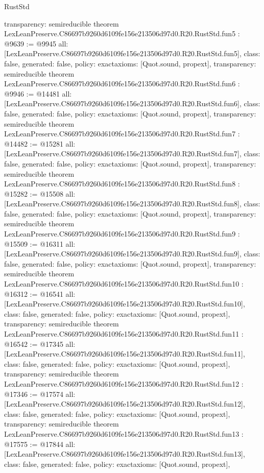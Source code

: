 \begin{lexlean}{RustStd}
\begin{coremodule}
{  transparency: semireducible
}
theorem LexLeanPreserve.C86697b9260d6109fe156e213506d97d0.R20.RustStd.fun5 : @9639 := @9945 {
  all: [LexLeanPreserve.C86697b9260d6109fe156e213506d97d0.R20.RustStd.fun5],
  class: false,
  generated: false,
  policy: exact{axioms: [Quot.sound, propext]},
  transparency: semireducible
}
theorem LexLeanPreserve.C86697b9260d6109fe156e213506d97d0.R20.RustStd.fun6 : @9946 := @14481 {
  all: [LexLeanPreserve.C86697b9260d6109fe156e213506d97d0.R20.RustStd.fun6],
  class: false,
  generated: false,
  policy: exact{axioms: [Quot.sound, propext]},
  transparency: semireducible
}
theorem LexLeanPreserve.C86697b9260d6109fe156e213506d97d0.R20.RustStd.fun7 : @14482 := @15281 {
  all: [LexLeanPreserve.C86697b9260d6109fe156e213506d97d0.R20.RustStd.fun7],
  class: false,
  generated: false,
  policy: exact{axioms: [Quot.sound, propext]},
  transparency: semireducible
}
theorem LexLeanPreserve.C86697b9260d6109fe156e213506d97d0.R20.RustStd.fun8 : @15282 := @15508 {
  all: [LexLeanPreserve.C86697b9260d6109fe156e213506d97d0.R20.RustStd.fun8],
  class: false,
  generated: false,
  policy: exact{axioms: [Quot.sound, propext]},
  transparency: semireducible
}
theorem LexLeanPreserve.C86697b9260d6109fe156e213506d97d0.R20.RustStd.fun9 : @15509 := @16311 {
  all: [LexLeanPreserve.C86697b9260d6109fe156e213506d97d0.R20.RustStd.fun9],
  class: false,
  generated: false,
  policy: exact{axioms: [Quot.sound, propext]},
  transparency: semireducible
}
theorem LexLeanPreserve.C86697b9260d6109fe156e213506d97d0.R20.RustStd.fun10 : @16312 := @16541 {
  all: [LexLeanPreserve.C86697b9260d6109fe156e213506d97d0.R20.RustStd.fun10],
  class: false,
  generated: false,
  policy: exact{axioms: [Quot.sound, propext]},
  transparency: semireducible
}
theorem LexLeanPreserve.C86697b9260d6109fe156e213506d97d0.R20.RustStd.fun11 : @16542 := @17345 {
  all: [LexLeanPreserve.C86697b9260d6109fe156e213506d97d0.R20.RustStd.fun11],
  class: false,
  generated: false,
  policy: exact{axioms: [Quot.sound, propext]},
  transparency: semireducible
}
theorem LexLeanPreserve.C86697b9260d6109fe156e213506d97d0.R20.RustStd.fun12 : @17346 := @17574 {
  all: [LexLeanPreserve.C86697b9260d6109fe156e213506d97d0.R20.RustStd.fun12],
  class: false,
  generated: false,
  policy: exact{axioms: [Quot.sound, propext]},
  transparency: semireducible
}
theorem LexLeanPreserve.C86697b9260d6109fe156e213506d97d0.R20.RustStd.fun13 : @17575 := @17844 {
  all: [LexLeanPreserve.C86697b9260d6109fe156e213506d97d0.R20.RustStd.fun13],
  class: false,
  generated: false,
  policy: exact{axioms: [Quot.sound, propext]},
}
\end{coremodule}
\end{lexlean}
